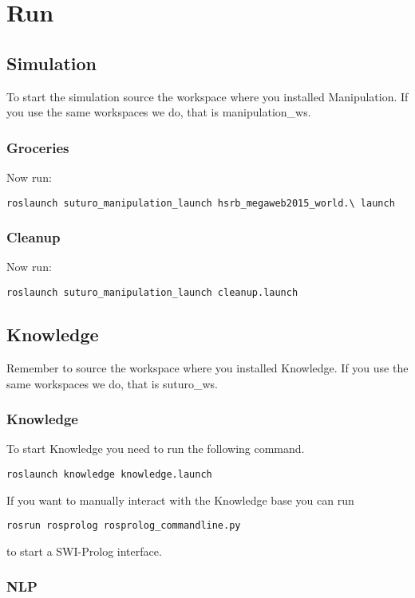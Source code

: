 \documentclass[main.tex]{subfiles}
\begin{document}
	\section{Run}
	\subsection{Simulation}
	To start the simulation source the workspace where you installed Manipulation.
	If you use the same workspaces we do, that is manipulation\_ws.
	\subsubsection{Groceries}
	Now run:\\
	\begin{lstlisting}
roslaunch suturo_manipulation_launch hsrb_megaweb2015_world.\ launch
\end{lstlisting}

	\subsubsection{Cleanup}
	Now run:\\
	\begin{lstlisting}
roslaunch suturo_manipulation_launch cleanup.launch
\end{lstlisting}

	\subsection{Knowledge}
	Remember to source the workspace where you installed Knowledge.
	If you use the same workspaces we do, that is suturo\_ws.
	\subsubsection{Knowledge}
	To start Knowledge you need to run the following command.\\
	\begin{lstlisting}
roslaunch knowledge knowledge.launch
\end{lstlisting}
If you want to manually interact with the Knowledge base you can run \\
\begin{lstlisting}
rosrun rosprolog rosprolog_commandline.py
\end{lstlisting}
to start a SWI-Prolog interface.
	
	\subsubsection{NLP}
	
\end{document}
